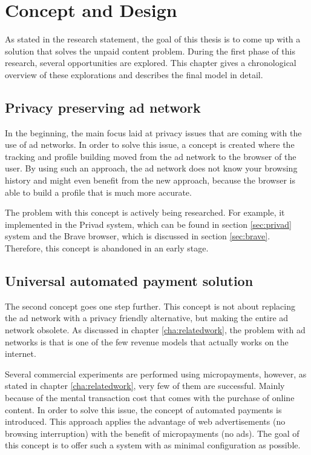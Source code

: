 \chapter{Concept and Design}
\label{cha:conceptanddesign}

As stated in the research statement, the goal of this thesis is to come up with a solution that solves the unpaid content problem. During the first phase of this research, several opportunities are explored. This chapter gives a chronological overview of these explorations and describes the final model in detail.

\section{Privacy preserving ad network}
In the beginning, the main focus laid at privacy issues that are coming with the use of ad networks. In order to solve this issue, a concept is created where the tracking and profile building moved from the ad network to the browser of the user. By using such an approach, the ad network does not know your browsing history and might even benefit from the new approach, because the browser is able to build a profile that is much more accurate. 

The problem with this concept is actively being researched. For example, it implemented in the Privad system, which can be found in section \ref{sec:privad} system and the Brave browser, which is discussed in section \ref{sec:brave}. Therefore, this concept is abandoned in an early stage.

\section{Universal automated payment solution}
The second concept goes one step further. This concept is not about replacing the ad network with a privacy friendly alternative, but making the entire ad network obsolete. As discussed in chapter \ref{cha:relatedwork}, the problem with ad networks is that is one of the few revenue models that actually works on the internet.

Several commercial experiments are performed using micropayments, however, as stated in chapter \ref{cha:relatedwork}, very few of them are successful. Mainly because of the mental transaction cost that comes with the purchase of online content. In order to solve this issue, the concept of automated payments is introduced. This approach applies the advantage of web advertisements (no browsing interruption) with the benefit of micropayments (no ads). The goal of this concept is to offer such a system with as minimal configuration as possible.

